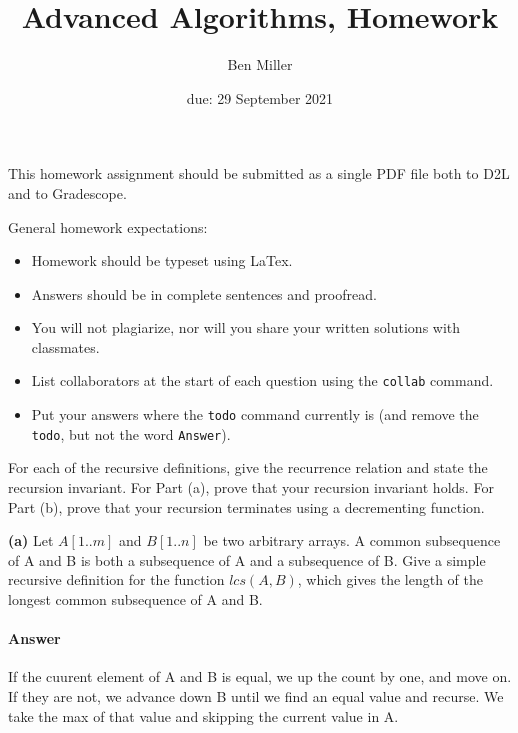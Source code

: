 \documentclass{article}
\title{Advanced Algorithms, Homework \hwnum}
\author{Ben Miller}
\date{due: 29 September 2021}
\begin{document}
\maketitle

This homework assignment should be
submitted as a single PDF file both to D2L and to Gradescope.

General homework expectations:
\begin{itemize}
    \item Homework should be typeset using LaTex.
    \item Answers should be in complete sentences and proofread.
    \item You will not plagiarize, nor will you share your written solutions
        with classmates.
    \item List collaborators at the start of each question using the
        \texttt{collab} command.
    \item Put your answers where the \texttt{todo} command currently is (and
        remove the \texttt{todo}, but not the word \texttt{Answer}).
\end{itemize}



\collab{}



For each of the recursive definitions, give the recurrence
relation and state the recursion invariant.  For Part (a), prove that your
recursion invariant holds.  For Part (b), prove that your recursion terminates
using a decrementing function.


{\bf  (a)} Let $A[1.. m]$ and $B[1.. n]$ be two arbitrary arrays. A common subsequence
of A and B is both a subsequence of A and a subsequence of B. Give
a simple recursive definition for the function $lcs(A, B)$, which gives the
length of the longest common subsequence of A and B.

\paragraph{Answer}

If the cuurent element of A and B is equal, we up the count by one, and move on.
If they are not, we advance down B until we find an equal value and recurse. We
take the max of that value and skipping the current value in A.
\end{document}
